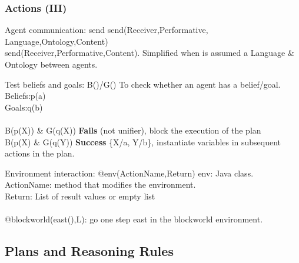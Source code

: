   \begin{frame}
    \frametitle{Actions (III)}
     \begin{block}{Agent communication: send}
    	send(Receiver,Performative, Language,Ontology,Content)\\
    	
    	send(Receiver,Performative,Content). Simplified when is assumed a Language \& Ontology between agents.
    \end{block}
        
    \begin{block}{Test beliefs and goals: B()/G()}
      To check whether an agent has a belief/goal. \\ 
      Beliefs:\tab p(a)\\
      Goals:\tab q(b)\\~\\
      B(p(X)) \& G(q(X)) \textbf{Fails} (not unifier), block the execution of the plan\\
      B(p(X) \& G(q(Y)) \textbf{Success} \{X/a, Y/b\}, instantiate variables in subsequent actions in the plan. 
    \end{block}
  \end{frame}
  \begin{frame}
	\begin{block}{Environment interaction: @env(ActionName,Return)}
		env: Java class.\\
		ActionName: method that modifies the environment.\\
		Return: List of result values or empty list\\~\\
		
		@blockworld(east(),L): go one step east in the blockworld environment.
	\end{block}	
  \end{frame}
  

\subsection{Plans and Reasoning Rules}
  
